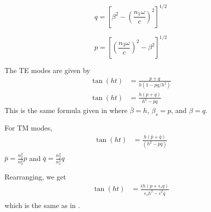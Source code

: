 \documentclass[12pt]{article}
\numberwithin{equation}{section}
\newcommand{\blue}[1]{\textcolor{blue}{#1}} %
\begin{document}
\begin{equation}
q = \left [ \beta^2 -  \left ( \frac{n_1 \omega}{c} \right )^2 \right ] ^{1/2}
\end{equation}

\begin{equation}
p = \left [ \left ( \frac{n_3 \omega}{c} \right )^2 - \beta^2 \right ] ^{1/2}
\end{equation}

The TE modes are given by 
\begin{align}
\tan (h t) &=  \frac{p + q}{h ( 1 - pq/h^2)} \\
\tan (h t) &=  \frac{h (p + q)}{h^2 - pq}
\end{align}
This is the same formula given in 
 \cite{Tikhodeev:02}
 where $\bar{\beta} = h$, $\beta_s = p$, and $\beta = q$.
 
For TM modes, 
\begin{align}
\tan (h t) &=  \frac{h (\bar{p} + \bar{q})}{(h^2 - \bar{p} \bar{q})} \\
\end{align}
$\bar{p} = \frac{n_2^2}{n_3^2} p$
and $\bar{q} = \frac{n_2^2}{n_1^2} q$


Rearranging, we get
\begin{align}
\tan (h t) &=  \frac{\bar{\epsilon} h (p + \epsilon_s q)}{\epsilon_s h^2 - \bar{\epsilon}^2 \bar{q}} \\
\end{align}
which is the same as in  \cite{Tikhodeev:02}.







\end{document}

